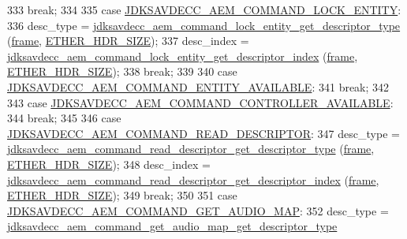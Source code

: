 \begin{DoxyCode}
333         \textcolor{keywordflow}{break};
334 
335     \textcolor{keywordflow}{case} \hyperlink{group__command_ga96be22db90d10cec463db06ab42751c4}{JDKSAVDECC\_AEM\_COMMAND\_LOCK\_ENTITY}:
336         desc\_type = \hyperlink{group__command__lock__entity_ga4e90852d171513d0347947869b00d7c5}{jdksavdecc\_aem\_command\_lock\_entity\_get\_descriptor\_type}
      (\hyperlink{gst__avb__playbin_8c_ac8e710e0b5e994c0545d75d69868c6f0}{frame}, \hyperlink{namespaceavdecc__lib_a6c827b1a0d973e18119c5e3da518e65ca9512ad9b34302ba7048d88197e0a2dc0}{ETHER\_HDR\_SIZE});
337         desc\_index = \hyperlink{group__command__lock__entity_gabfe9a5d0582adea94a9b28e47c7e2358}{jdksavdecc\_aem\_command\_lock\_entity\_get\_descriptor\_index}
      (\hyperlink{gst__avb__playbin_8c_ac8e710e0b5e994c0545d75d69868c6f0}{frame}, \hyperlink{namespaceavdecc__lib_a6c827b1a0d973e18119c5e3da518e65ca9512ad9b34302ba7048d88197e0a2dc0}{ETHER\_HDR\_SIZE});
338         \textcolor{keywordflow}{break};
339 
340     \textcolor{keywordflow}{case} \hyperlink{group__command_ga9fd008c3de503ebf99111e4464e3142d}{JDKSAVDECC\_AEM\_COMMAND\_ENTITY\_AVAILABLE}:
341         \textcolor{keywordflow}{break};
342 
343     \textcolor{keywordflow}{case} \hyperlink{group__command_ga742fafae5e26884f3caac94dcc6c2814}{JDKSAVDECC\_AEM\_COMMAND\_CONTROLLER\_AVAILABLE}:
344         \textcolor{keywordflow}{break};
345 
346     \textcolor{keywordflow}{case} \hyperlink{group__command_gaa6a32a290cbec71466b571590b05fd00}{JDKSAVDECC\_AEM\_COMMAND\_READ\_DESCRIPTOR}:
347         desc\_type = \hyperlink{group__command__read__descriptor_gaa141e1ed9bc9fd0176ab593146aa6ef2}{jdksavdecc\_aem\_command\_read\_descriptor\_get\_descriptor\_type}
      (\hyperlink{gst__avb__playbin_8c_ac8e710e0b5e994c0545d75d69868c6f0}{frame}, \hyperlink{namespaceavdecc__lib_a6c827b1a0d973e18119c5e3da518e65ca9512ad9b34302ba7048d88197e0a2dc0}{ETHER\_HDR\_SIZE});
348         desc\_index = \hyperlink{group__command__read__descriptor_gabfc491b799a6904e6c80e95c62755e0b}{jdksavdecc\_aem\_command\_read\_descriptor\_get\_descriptor\_index}
      (\hyperlink{gst__avb__playbin_8c_ac8e710e0b5e994c0545d75d69868c6f0}{frame}, \hyperlink{namespaceavdecc__lib_a6c827b1a0d973e18119c5e3da518e65ca9512ad9b34302ba7048d88197e0a2dc0}{ETHER\_HDR\_SIZE});
349         \textcolor{keywordflow}{break};
350 
351     \textcolor{keywordflow}{case} \hyperlink{group__command_ga5d806d56b7dfd0104e5e127c910dbb65}{JDKSAVDECC\_AEM\_COMMAND\_GET\_AUDIO\_MAP}:
352         desc\_type = \hyperlink{group__command__get__audio__map_gaffddbc426fe3b47801bf90ce6866ea4d}{jdksavdecc\_aem\_command\_get\_audio\_map\_get\_descriptor\_type}

\end{DoxyCode}
